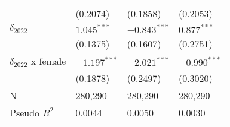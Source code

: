 \begin{tabular}{llll}
                           &           (0.2074) &           (0.1858) &           (0.2053) \\
$\delta_{2022}$            &      $1.045^{***}$ &     $-0.843^{***}$ &      $0.877^{***}$ \\
                           &           (0.1375) &           (0.1607) &           (0.2751) \\
$\delta_{2022}$ x female   &     $-1.197^{***}$ &     $-2.021^{***}$ &     $-0.990^{***}$ \\
                           &           (0.1878) &           (0.2497) &           (0.3020) \\
N                          &            280,290 &            280,290 &            280,290 \\
Pseudo $R^2$               &             0.0044 &             0.0050 &             0.0030 \\
\bottomrule
\end{tabular}
